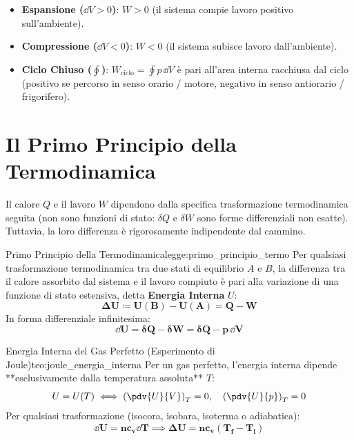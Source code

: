 \begin{itemize}
    \item \textbf{Espansione ($\dd V > 0$)}: $W > 0$ (il sistema compie lavoro positivo sull'ambiente).
    \item \textbf{Compressione ($\dd V < 0$)}: $W < 0$ (il sistema subisce lavoro dall'ambiente).
    \item \textbf{Ciclo Chiuso ($\oint$)}: $W_{\text{ciclo}} = \oint p\,\dd V$ è pari all'area interna racchiusa dal ciclo (positivo se percorso in senso orario / motore, negativo in senso antiorario / frigorifero).
\end{itemize}

\section{Il Primo Principio della Termodinamica}
\label{sec:primo_principio}

Il calore $Q$ e il lavoro $W$ dipendono dalla specifica trasformazione termodinamica seguita (non sono funzioni di stato: $\delta Q$ e $\delta W$ sono forme differenziali non esatte). Tuttavia, la loro differenza è rigorosamente indipendente dal cammino.

\begin{legge}{Primo Principio della Termodinamica}{legge:primo_principio_termo}
Per qualsiasi trasformazione termodinamica tra due stati di equilibrio $A$ e $B$, la differenza tra il calore assorbito dal sistema e il lavoro compiuto è pari alla variazione di una funzione di stato estensiva, detta \textbf{Energia Interna} $U$:
\begin{equation}
    \mathbf{\Delta U \coloneqq U(B) - U(A) = Q - W}
    \label{eq:primo_principio}
\end{equation}
In forma differenziale infinitesima:
\begin{equation}
    \mathbf{\dd U = \delta Q - \delta W = \delta Q - p\,\dd V}
    \label{eq:primo_principio_diff}
\end{equation}
\end{legge}

\begin{teorema}{Energia Interna del Gas Perfetto (Esperimento di Joule)}{teo:joule_energia_interna}
Per un gas perfetto, l'energia interna dipende **esclusivamente dalla temperatura assoluta** $T$:
\begin{equation}
    U = U(T) \iff \left(\pdv{U}{V}\right)_T = 0, \quad \left(\pdv{U}{p}\right)_T = 0
    \label{eq:u_gas_perfetto}
\end{equation}
Per qualsiasi trasformazione (isocora, isobara, isoterma o adiabatica):
\begin{equation}
    \mathbf{\dd U = n c_v \dd T \implies \Delta U = n c_v (T_f - T_i)}
    \label{eq:delta_u_generale}
\end{equation}
\end{teorema}

